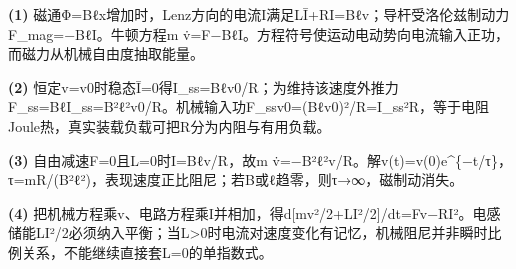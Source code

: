 \par\noindent\textbf{(1)} 磁通Φ=Bℓx增加时，Lenz方向的电流I满足LĪ+RI=Bℓv；导杆受洛伦兹制动力F\_mag=−BℓI。牛顿方程m v̇=F−BℓI。方程符号使运动电动势向电流输入正功，而磁力从机械自由度抽取能量。
\par\noindent\textbf{(2)} 恒定v=v0时稳态Ī=0得I\_ss=Bℓv0/R；为维持该速度外推力F\_ss=BℓI\_ss=B²ℓ²v0/R。机械输入功F\_ssv0=(Bℓv0)²/R=I\_ss²R，等于电阻Joule热，真实装载负载可把R分为内阻与有用负载。
\par\noindent\textbf{(3)} 自由减速F=0且L=0时I=Bℓv/R，故m v̇=−B²ℓ²v/R。解v(t)=v(0)e\textasciicircum{}\{−t/τ\}，τ=mR/(B²ℓ²)，表现速度正比阻尼；若B或ℓ趋零，则τ→∞，磁制动消失。
\par\noindent\textbf{(4)} 把机械方程乘v、电路方程乘I并相加，得d[mv²/2+LI²/2]/dt=Fv−RI²。电感储能LI²/2必须纳入平衡；当L>0时电流对速度变化有记忆，机械阻尼并非瞬时比例关系，不能继续直接套L=0的单指数式。

